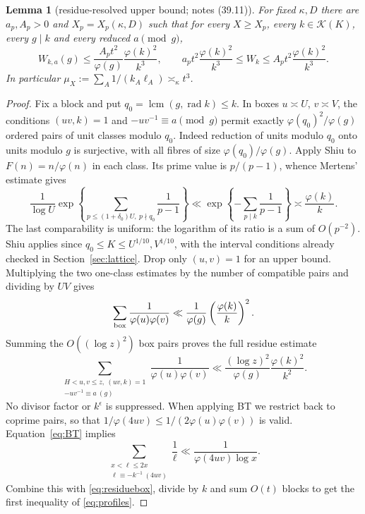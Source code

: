 \documentclass[10pt,reqno]{amsart}
\newtheorem{lemma}[theorem]{Lemma}
\theoremstyle{remark}
\newcommand{\K}{\mathcal K}
\newcommand{\lcm}{\operatorname{lcm}}
\newcommand{\rad}{\operatorname{rad}}
\begin{document}
\begin{lemma}[residue-resolved upper bound; notes (39.11)]\label{lem:profile}
For fixed $\kappa,D$ there are $a_p,A_p>0$ and $X_p=X_p(\kappa,D)$ such
that for every $X\geq X_p$, every $k\in\K(K)$, every $g\mid k$ and every
reduced $a\pmod g$,
\begin{equation}\label{eq:profiles}
 W_{k,a}(g)\leq\frac{A_pt^2}{\varphi(g)}\frac{\varphi(k)^2}{k^3},
 \qquad
 a_pt^2\frac{\varphi(k)^2}{k^3}\leq W_k
       \leq A_pt^2\frac{\varphi(k)^2}{k^3}.
\end{equation}
In particular $\mu_X:=\sum_A1/(k_A\ell_A)\asymp_\kappa t^3$.
\end{lemma}
\begin{proof}
Fix a block and put $q_0=\lcm(g,\rad k)\leq k$.  In boxes
$u\asymp U$, $v\asymp V$, the conditions $(uv,k)=1$ and
$-uv^{-1}\equiv a\pmod g$ permit exactly
$\varphi(q_0)^2/\varphi(g)$ ordered pairs of unit classes modulo $q_0$.
Indeed reduction of units modulo $q_0$ onto units modulo $g$ is
surjective, with all fibres of size $\varphi(q_0)/\varphi(g)$.
Apply Shiu to $F(n)=n/\varphi(n)$ in each class.  Its prime value is
$p/(p-1)$, whence Mertens' estimate gives
\[
 \frac1{\log U}\exp\left\{\sum_{p\leq(1+\delta_0)U,\ p\nmid q_0}
                              \frac1{p-1}\right\}
 \ll\exp\left\{-\sum_{p\mid k}\frac1{p-1}\right\}
 \asymp\frac{\varphi(k)}k.
\]
The last comparability is uniform: the logarithm of its ratio is a sum
of $O(p^{-2})$.  Shiu applies since $q_0\leq K\leq U^{1/10},V^{1/10}$,
with the interval conditions already checked in Section~\ref{sec:lattice}.
Drop only $(u,v)=1$ for an upper bound.  Multiplying the two one-class
estimates by the number of compatible pairs and dividing by $UV$ gives
\[
 \sum_{\rm box}\frac1{\varphi(u)\varphi(v)}
 \ll\frac1{\varphi(g)}\left(\frac{\varphi(k)}k\right)^2.
\]
Summing the $O((\log z)^2)$ box pairs proves the full residue estimate
\begin{equation}\label{eq:residuebox}
 \sum_{\substack{H<u,v\leq z,\ (uv,k)=1\\-uv^{-1}\equiv a\ (g)}}
 \frac1{\varphi(u)\varphi(v)}
 \ll\frac{(\log z)^2}{\varphi(g)}\frac{\varphi(k)^2}{k^2}.
\end{equation}
No divisor factor or $k^\epsilon$ is suppressed.  When applying BT we
restrict back to coprime pairs, so that
$1/\varphi(4uv)\leq1/(2\varphi(u)\varphi(v))$ is valid.
Equation~\eqref{eq:BT} implies
\[
 \sum_{\substack{x<\ell\leq2x\\\ell\equiv-k^{-1}\ (4uv)}}\frac1\ell
 \ll\frac1{\varphi(4uv)\log x}.
\]
Combine this with \eqref{eq:residuebox}, divide by $k$ and sum $O(t)$
blocks to get the first inequality of \eqref{eq:profiles}.


\end{proof}
\end{document}
